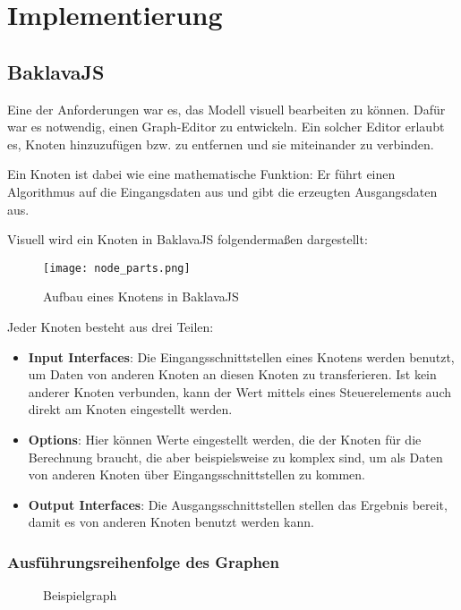 
\chapter{Implementierung}

\section{BaklavaJS}

Eine der Anforderungen war es, das Modell visuell bearbeiten zu können. Dafür war es notwendig, einen Graph-Editor zu entwickeln. Ein solcher Editor erlaubt es, Knoten hinzuzufügen bzw. zu entfernen und sie miteinander zu verbinden.

Ein Knoten ist dabei wie eine mathematische Funktion: Er führt einen Algorithmus auf die Eingangsdaten aus und gibt die erzeugten Ausgangsdaten aus.

Visuell wird ein Knoten in BaklavaJS folgendermaßen dargestellt:

\begin{figure}[H]
    \centering
    \texttt{[image: node\_parts.png]}
    \caption{Aufbau eines Knotens in BaklavaJS}
    \label{fig:nodeparts}
\end{figure}

Jeder Knoten besteht aus drei Teilen:
\begin{itemize}
    \item \textbf{Input Interfaces}: Die Eingangsschnittstellen eines Knotens werden benutzt, um Daten von anderen Knoten an diesen Knoten zu transferieren. Ist kein anderer Knoten verbunden, kann der Wert mittels eines Steuerelements auch direkt am Knoten eingestellt werden.
    \item \textbf{Options}: Hier können Werte eingestellt werden, die der Knoten für die Berechnung braucht, die aber beispielsweise zu komplex sind, um als Daten von anderen Knoten über Eingangsschnittstellen zu kommen.
    \item \textbf{Output Interfaces}: Die Ausgangsschnittstellen stellen das Ergebnis bereit, damit es von anderen Knoten benutzt werden kann.
\end{itemize}

\subsection{Ausführungsreihenfolge des Graphen}

\begin{figure}[H]
    \centering
    \caption{Beispielgraph}
    \label{fig:nodeExecutionOrder1}
\end{figure}

